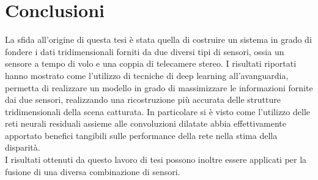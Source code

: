 \chapter{Conclusioni}
La sfida all'origine di questa tesi è stata quella di costruire un sistema in grado di fondere i dati tridimensionali forniti da due diversi tipi di sensori, ossia un sensore a tempo di volo e una coppia di telecamere stereo. I risultati riportati hanno mostrato come l'utilizzo di tecniche di deep learning all'avanguardia, permetta di realizzare un modello in grado di massimizzare le informazioni fornite dai due sensori, realizzando una ricostruzione più accurata delle strutture tridimensionali della scena catturata. In particolare si è visto come l'utilizzo delle reti neurali residuali assieme alle convoluzioni dilatate abbia effettivamente apportato benefici tangibili sulle performance della rete nella stima della disparità.\\
I risultati ottenuti da questo lavoro di tesi possono inoltre essere applicati per la fusione di una diversa combinazione di sensori.